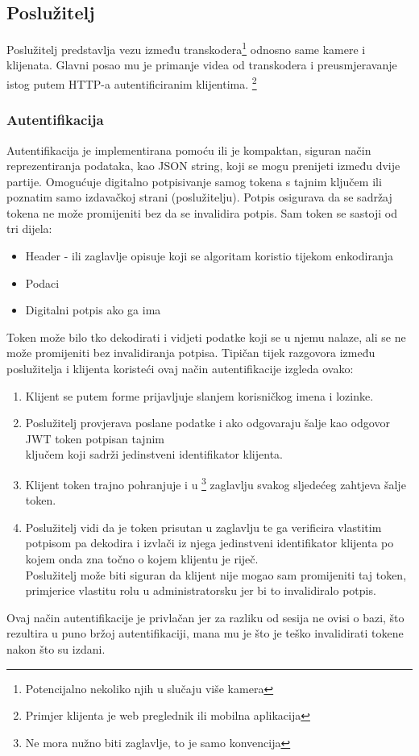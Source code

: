 \subsection{Poslužitelj}
Poslužitelj predstavlja vezu između transkodera\footnote{Potencijalno nekoliko njih u slučaju više kamera} odnosno same 
kamere i klijenata.
\paraBreak
Glavni posao mu je primanje videa od transkodera i preusmjeravanje istog putem HTTP-a autentificiranim klijentima.
\footnote{Primjer klijenta je web preglednik ili mobilna aplikacija}
\subsubsection{Autentifikacija}
Autentifikacija je implementirana pomoću  ili 
 \label{sec:jwt}
 je kompaktan, siguran način reprezentiranja podataka, kao JSON string, koji se mogu
prenijeti između dvije partije.
\paraBreak
Omogućuje digitalno potpisivanje samog tokena s tajnim ključem ili  poznatim samo izdavačkoj 
strani (poslužitelju). Potpis osigurava da se sadržaj tokena ne može promijeniti bez da se invalidira potpis. \cite{JWT}
\paraBreak
Sam token se sastoji od tri dijela:
\begin{itemize}
  \item Header - ili zaglavlje opisuje koji se algoritam koristio tijekom enkodiranja
  \item Podaci
  \item Digitalni potpis ako ga ima
\end{itemize}
Token može bilo tko dekodirati i vidjeti podatke koji se u njemu nalaze, ali se ne može promijeniti bez invalidiranja
potpisa. \cite{JWT}
\paraBreak
Tipičan tijek razgovora između poslužitelja i klijenta koristeći ovaj način autentifikacije izgleda ovako:
\begin{enumerate}
  \item Klijent se putem forme prijavljuje slanjem korisničkog imena i lozinke.
  \item Poslužitelj provjerava poslane podatke i ako odgovaraju šalje kao odgovor JWT token potpisan tajnim \\
  ključem koji sadrži jedinstveni identifikator klijenta.
  \item Klijent token trajno pohranjuje i u  
    \footnote{Ne mora nužno biti  zaglavlje, to je samo konvencija} 
    zaglavlju svakog sljedećeg zahtjeva
    šalje token.
  \item Poslužitelj vidi da je token prisutan u zaglavlju te ga verificira vlastitim potpisom pa dekodira i izvlači iz 
    njega jedinstveni identifikator klijenta po kojem onda zna točno o kojem klijentu je riječ. \\
    Poslužitelj može biti siguran da klijent nije mogao sam promijeniti taj token, primjerice vlastitu rolu u 
    administratorsku jer bi to invalidiralo potpis.
\end{enumerate}
Ovaj način autentifikacije je privlačan jer za razliku od sesija ne ovisi o bazi, što rezultira u puno bržoj 
autentifikaciji, mana mu je što je teško invalidirati tokene nakon što su izdani. \cite{JWT}

